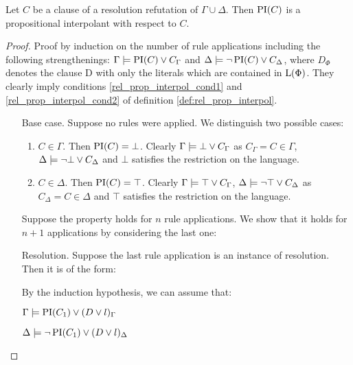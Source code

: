 \begin{prop}
	\label{prop:prop_interpol}
	Let $C$ be a clause of a resolution refutation of $\Gamma \cup \Delta$.
	Then $\operatorname{PI}(C)$ is a propositional interpolant with respect to $C$. 
\end{prop}
\begin{proof}
	Proof by induction on the number of rule applications including the following strengthenings:
	$\Gamma \models \operatorname{PI}(C) \lor C_\Gamma$ and
	$\Delta \models \lnot \operatorname{PI}(C) \lor C_\Delta$, where $D_\Phi$ denotes the clause D with only the literals which are contained in $\operatorname{L}(\Phi)$. They clearly imply conditions \ref{rel_prop_interpol_cond1} and \ref{rel_prop_interpol_cond2} of definition \ref{def:rel_prop_interpol}. 

	\begin{itemize}
		\item[Base case.]
			Suppose no rules were applied. We distinguish two possible cases:
			\begin{enumerate}
				\item $C \in \Gamma$.
					Then $\operatorname{PI}(C) = \bot$. Clearly $\Gamma \models \bot \lor C_\Gamma$ as $C_\Gamma = C \in \Gamma$, $\Delta \models \lnot \bot \lor C_\Delta$ and $\bot$ satisfies the restriction on the language.

				\item $C \in \Delta$.
					Then $\operatorname{PI}(C) = \top$. Clearly $\Gamma \models \top \lor C_\Gamma$, $\Delta \models \lnot \top \lor C_\Delta$ as $C_\Delta = C \in \Delta$ and $\top$ satisfies the restriction on the language.
			\end{enumerate}

			Suppose the property holds for $n$ rule applications.
			We show that it holds for $n+1$ applications by considering the last one:

		\item[Resolution.]
			Suppose the last rule application is an instance of resolution. Then it is of the form:
			\begin{prooftree}
			\end{prooftree}

			By the induction hypothesis, we can assume that:

			$\Gamma \models \operatorname{PI}(C_1) \lor (D\lor l)_\Gamma$

			$\Delta \models \lnot \operatorname{PI}(C_1) \lor (D\lor l)_\Delta$


\end{itemize}
\end{proof}
